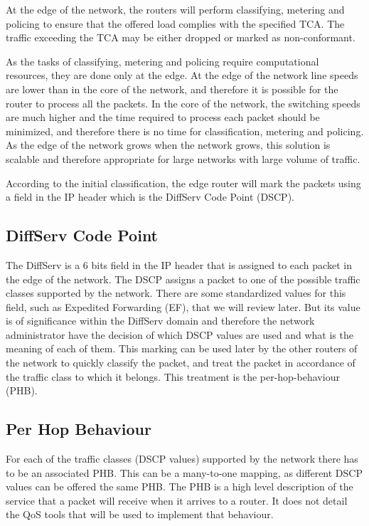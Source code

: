 At the edge of the network, the routers will perform classifying, metering and policing to ensure that the offered load complies with the specified TCA.
The traffic exceeding the TCA may be either dropped or marked as non-conformant.

As the tasks of classifying, metering and policing require computational resources, they are done only at the edge.
At the edge of the network line speeds are lower than in the core of the network, and therefore it is possible for the router to process all the packets.
In the core of the network, the switching speeds are much higher and the time required to process each packet should be minimized, and therefore there is no time for classification, metering and policing.
As the edge of the network grows when the network grows, this solution is scalable and therefore appropriate for large networks with large volume of traffic.

According to the initial classification, the edge router will mark the packets using a field in the IP header which is the DiffServ Code Point (DSCP).

\subsection{DiffServ Code Point}

The DiffServ is a 6 bits field in the IP header that is assigned to each packet in the edge of the network.
The DSCP assigns a packet to one of the possible traffic classes supported by the network.
There are some standardized values for this field, such as Expedited Forwarding (EF), that we will review later.
But its value is of significance within the DiffServ domain and therefore the network administrator have the decision of which DSCP values are used and what is the meaning of each of them.
This marking can be used later by the other routers of the network to quickly classify the packet, and treat the packet in accordance of the traffic class to which it belongs.
This treatment is the per-hop-behaviour (PHB).

\subsection{Per Hop Behaviour}

For each of the traffic classes (DSCP values) supported by the network there has to be an associated PHB.
This can be a many-to-one mapping, as different DSCP values can be offered the same PHB.
The PHB is a high level description of the service that a packet will receive when it arrives to a router.
It does not detail the QoS tools that will be used to implement that behaviour.

